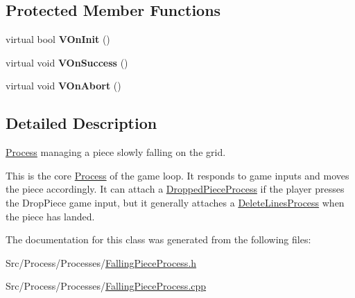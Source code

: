 \subsection*{Protected Member Functions}
\begin{DoxyCompactItemize}
\item 
\hypertarget{classFallingPieceProcess_a75ee40dae2f16dd49985a754cdb33ab4}{virtual bool {\bfseries V\-On\-Init} ()}\label{classFallingPieceProcess_a75ee40dae2f16dd49985a754cdb33ab4}

\item 
\hypertarget{classFallingPieceProcess_a4dc0e2d17b4283c53e9797b19a677409}{virtual void {\bfseries V\-On\-Success} ()}\label{classFallingPieceProcess_a4dc0e2d17b4283c53e9797b19a677409}

\item 
\hypertarget{classFallingPieceProcess_a42e3c19c4e15f20f866a8158a487e44d}{virtual void {\bfseries V\-On\-Abort} ()}\label{classFallingPieceProcess_a42e3c19c4e15f20f866a8158a487e44d}

\end{DoxyCompactItemize}


\subsection{Detailed Description}
\hyperlink{classProcess}{Process} managing a piece slowly falling on the grid. 

This is the core \hyperlink{classProcess}{Process} of the game loop. It responds to game inputs and moves the piece accordingly. It can attach a \hyperlink{classDroppedPieceProcess}{Dropped\-Piece\-Process} if the player presses the Drop\-Piece game input, but it generally attaches a \hyperlink{classDeleteLinesProcess}{Delete\-Lines\-Process} when the piece has landed. 

The documentation for this class was generated from the following files\-:\begin{DoxyCompactItemize}
\item 
Src/\-Process/\-Processes/\hyperlink{FallingPieceProcess_8h}{Falling\-Piece\-Process.\-h}\item 
Src/\-Process/\-Processes/\hyperlink{FallingPieceProcess_8cpp}{Falling\-Piece\-Process.\-cpp}\end{DoxyCompactItemize}
